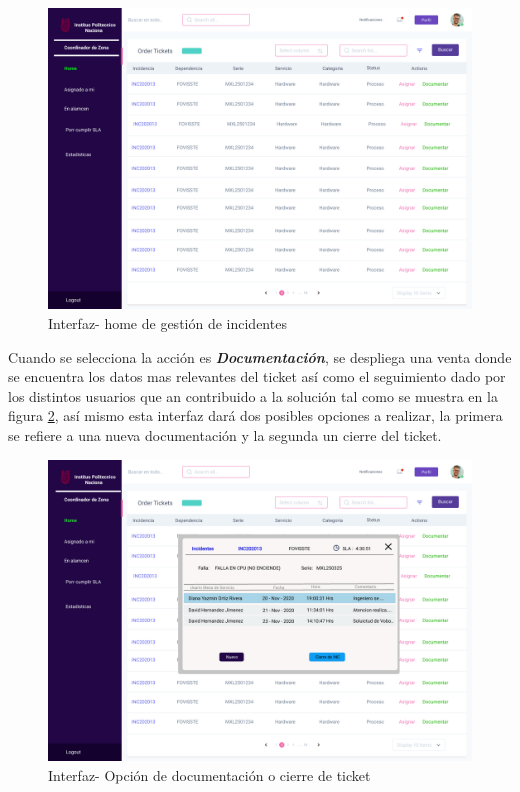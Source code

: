 	\begin{figure}[H]
	\centering
	\includegraphics[width=1.1\textwidth]{Capitulo4/Img/GestionInc/Home}
	\caption{Interfaz- home de gestión de incidentes}
	\label{fig:IFDGDIH}
\end{figure}
Cuando se selecciona la acción es \textbf{\textit{	Documentación}}, se despliega una venta donde se encuentra los datos mas relevantes del ticket así como el seguimiento dado por los distintos usuarios que an contribuido a la solución tal como se muestra en la figura \ref{fig:IFDDTOPS}, así mismo esta  interfaz  dará dos posibles opciones a realizar, la primera se refiere a una nueva documentación y la segunda un cierre del ticket.

	\begin{figure}[H]
	\centering
	\includegraphics[width=1.1\textwidth]{Capitulo4/Img/GestionInc/Documentar-nuevo-seg}
	\caption{Interfaz- Opción de documentación o cierre de ticket }
	\label{fig:IFDDTOPS}
\end{figure}

